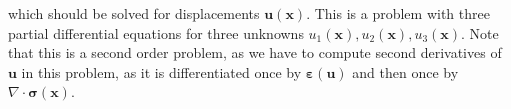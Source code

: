  which should be solved for displacements $\mathbf{u}(\mathbf{x})$. This is a problem with three partial differential equations for three unknowns $u_1(\mathbf{x}), u_2(\mathbf{x}), u_3(\mathbf{x})$.
Note that this is a second order problem, as we have to compute second derivatives of $\mathbf{u}$ in this problem, as it is differentiated once by $\pmb{\varepsilon}(\mathbf{u})$ and then once by $\nabla \cdot \pmb{\sigma}(\mathbf{x})$.

    


    

